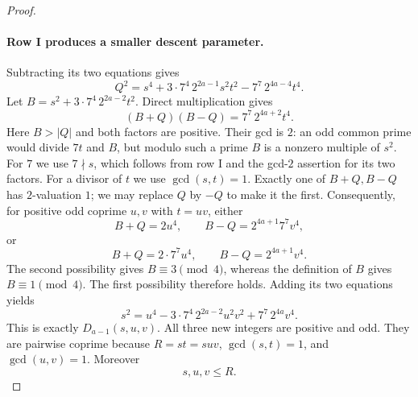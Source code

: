 \begin{proof}
\paragraph{Row I produces a smaller descent parameter.}
Subtracting its two equations gives
\[
 Q^2=s^4+3\cdot7^4\,2^{2a-1}s^2t^2
                    -7^7\,2^{4a-4}t^4.
\]
Let $B=s^2+3\cdot7^4\,2^{2a-2}t^2$.  Direct multiplication gives
\begin{equation}\label{eq:seven-second-product}
 (B+Q)(B-Q)=7^7\,2^{4a+2}t^4.
\end{equation}
Here $B>|Q|$ and both factors are positive.  Their gcd is $2$: an odd common
prime would divide $7t$ and $B$, but modulo such a prime $B$ is a nonzero
multiple of $s^2$.  For $7$ we use $7\nmid s$, which follows from row I
and the gcd-$2$ assertion for its two factors.  For a divisor of $t$ we use
$\gcd(s,t)=1$.  Exactly one of $B+Q,B-Q$ has $2$-valuation $1$; we may replace
$Q$ by $-Q$ to make it the first.  Consequently, for positive odd coprime
$u,v$ with $t=uv$, either
\[
 B+Q=2u^4,\qquad B-Q=2^{4a+1}7^7v^4,
\]
or
\[
 B+Q=2\cdot7^7u^4,\qquad B-Q=2^{4a+1}v^4.
\]
The second possibility gives $B\equiv3\pmod4$, whereas the definition of
$B$ gives $B\equiv1\pmod4$.  The first possibility therefore holds.  Adding
its two equations yields
\[
 s^2=u^4-3\cdot7^4\,2^{2a-2}u^2v^2
                    +7^7\,2^{4a}v^4.
\]
This is exactly $D_{a-1}(s,u,v)$.  All three new integers are positive and
odd.  They are pairwise coprime because $R=st=suv$, $\gcd(s,t)=1$, and
$\gcd(u,v)=1$.  Moreover
\begin{equation}\label{eq:seven-descent-bound}
 s,u,v\leq R.
\end{equation}


\end{proof}
